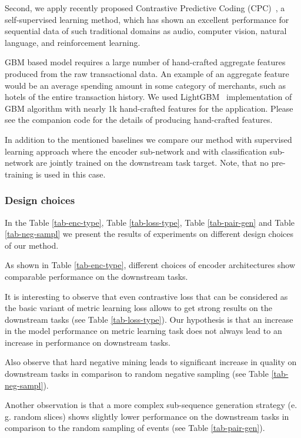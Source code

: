 \documentclass{article}
\begin{document}
Second, we apply recently proposed Contrastive Predictive Coding (CPC)~\cite{Oord2018RepresentationLW}, a self-supervised learning method, which has shown an excellent performance for sequential data of such traditional domains as audio, computer vision, natural language, and reinforcement learning. %

GBM based model requires a large number of hand-crafted aggregate features produced from the raw transactional data. An example of an aggregate feature would be an average spending amount in some category of merchants, such as hotels of the entire transaction history.
We used LightGBM~\cite{Ke2017LightGBMAH} implementation of GBM algorithm with nearly 1k hand-crafted features for the application. Please see the companion code for the details of producing hand-crafted features.

In addition to the mentioned baselines we compare our method with supervised learning approach where the encoder sub-network and with classification sub-network are jointly trained on the downstream task target. Note, that no pre-training is used in this case.

\subsubsection{Design choices}

In the Table \ref{tab-enc-type}, Table \ref{tab-loss-type}, Table \ref{tab-pair-gen} and Table \ref{tab-neg-sampl} we present the results of experiments on different design choices of our method.

As shown in Table \ref{tab-enc-type}, different choices of encoder architectures show comparable performance on the downstream tasks.

It is interesting to observe that even contrastive loss that can be considered as the basic variant of metric learning loss allows to get strong results on the downstream tasks (see Table \ref{tab-loss-type}). Our hypothesis is that an increase in the model performance on metric learning task does not always lead to an increase in performance on downstream tasks.

Also observe that hard negative mining leads to significant increase in quality on downstream tasks in comparison to random negative sampling (see Table \ref{tab-neg-sampl}).

Another observation is that a more complex sub-sequence generation strategy (e. g. random slices) shows slightly lower performance on the downstream tasks in comparison to the random sampling of events (see Table \ref{tab-pair-gen}).
\end{document}

